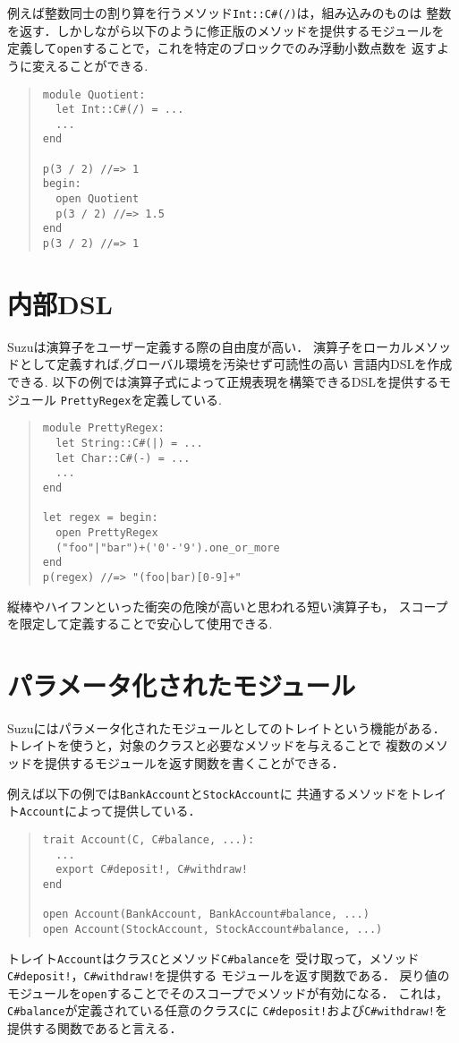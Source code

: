 \documentclass[a4paper,11pt,dvipdfmx]{jreport}
\begin{document}
例えば整数同士の割り算を行うメソッド\verb|Int::C#(/)|は，組み込みのものは
整数を返す．しかしながら以下のように修正版のメソッドを提供するモジュールを
定義して\verb|open|することで，これを特定のブロックでのみ浮動小数点数を
返すように変えることができる.
\begin{quote}
\begin{verbatim}
module Quotient:
  let Int::C#(/) = ...
  ...
end

p(3 / 2) //=> 1
begin:
  open Quotient
  p(3 / 2) //=> 1.5
end
p(3 / 2) //=> 1
\end{verbatim}
\end{quote}

\section{内部DSL}

Suzuは演算子をユーザー定義する際の自由度が高い．
演算子をローカルメソッドとして定義すれば,グローバル環境を汚染せず可読性の高い
言語内DSLを作成できる.
以下の例では演算子式によって正規表現を構築できるDSLを提供するモジュール
\verb|PrettyRegex|を定義している.
\begin{quote}
\begin{verbatim}
module PrettyRegex:
  let String::C#(|) = ...
  let Char::C#(-) = ...
  ...
end

let regex = begin:
  open PrettyRegex
  ("foo"|"bar")+('0'-'9').one_or_more
end
p(regex) //=> "(foo|bar)[0-9]+"
\end{verbatim}
\end{quote}
縦棒やハイフンといった衝突の危険が高いと思われる短い演算子も，
スコープを限定して定義することで安心して使用できる.

\section{パラメータ化されたモジュール}

Suzuにはパラメータ化されたモジュールとしてのトレイトという機能がある．
トレイトを使うと，対象のクラスと必要なメソッドを与えることで
複数のメソッドを提供するモジュールを返す関数を書くことができる．

例えば以下の例では\verb|BankAccount|と\verb|StockAccount|に
共通するメソッドをトレイト\verb|Account|によって提供している．
\begin{quote}
\begin{verbatim}
trait Account(C, C#balance, ...):
  ...
  export C#deposit!, C#withdraw!
end

open Account(BankAccount, BankAccount#balance, ...)
open Account(StockAccount, StockAccount#balance, ...)
\end{verbatim}
\end{quote}
トレイト\verb|Account|はクラス\verb|C|とメソッド\verb|C#balance|を
受け取って，メソッド\verb|C#deposit!|，\verb|C#withdraw!|を提供する
モジュールを返す関数である．
戻り値のモジュールを\verb|open|することでそのスコープでメソッドが有効になる．
これは，\verb|C#balance|が定義されている任意のクラス\verb|C|に
\verb|C#deposit!|および\verb|C#withdraw!|を提供する関数であると言える．
\end{document}
